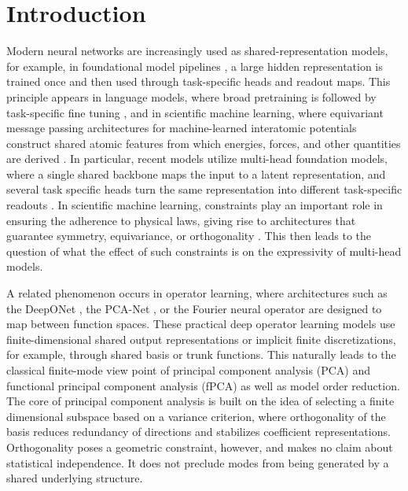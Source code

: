 \documentclass[twoside,11pt]{article}
\begin{document}
\section{Introduction}
\label{sec:intro}

Modern neural networks are increasingly used as shared-representation models, for example, in foundational model pipelines \citep{Bommasani22OpportunitiesRisksFoundation}, a large hidden representation is trained once and then used through task-specific heads and readout maps.
This principle appears in language models, where broad pretraining is followed by task-specific fine tuning \citep[see][]{Brown20LanguageModelsArea,Touvron23Llama2Open},
and in scientific machine learning, where equivariant message passing architectures for machine-learned interatomic potentials
construct shared atomic features from which energies, forces, and other quantities are derived \citep[see for example the MACE model of][]{Batatia22MACEHigherOrder}.
In particular, recent models utilize multi-head foundation models, where a single shared backbone maps the input to a latent representation, and several task specific heads turn the same representation into different task-specific readouts  \citep[see][]{Batatia25FoundationModelAtomistic,Batatia25CrossLearningElectronic}.
In scientific machine learning, constraints play an important role in ensuring the adherence to physical laws, giving rise to architectures that guarantee symmetry, equivariance, or orthogonality \citep{Cohen16GroupEquivariantConvolutional,Bronstein21GeometricDeepLearning}.
This then leads to the question of what the effect of such constraints is on the expressivity of multi-head models.


A related phenomenon occurs in operator learning, where architectures such as the DeepONet \citep{Lu21LearningNonlinearOperators}, the PCA-Net \citep{Bhattacharya21ModelReductionNeural}, or the Fourier neural operator \citep{Li21FourierNeuralOperator} are designed to map between function spaces.
These practical deep operator learning models use finite-dimensional shared output representations or implicit finite discretizations, for example, through shared basis or trunk functions.
This naturally leads to the classical finite-mode view point of principal component analysis (PCA) \citep{Jolliffe02PrincipalComponentAnalysis} and functional principal component analysis (fPCA) \citep{Ramsay05FunctionalDataAnalysis} as well as model order reduction.
The core of principal component analysis is built on the idea of selecting a finite dimensional subspace based on a variance criterion,
where orthogonality of the basis reduces redundancy of directions and stabilizes coefficient representations.
Orthogonality poses a geometric constraint, however, and makes no claim about statistical independence.
It does not preclude modes from being generated by a shared underlying structure.
\end{document}
